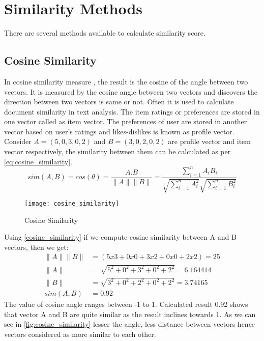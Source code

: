 
\section{Similarity Methods}
\label{similarity_methods}
There are several methods available to calculate similarity score.
\\

\subsection{Cosine Similarity}
\label{cosine_similarity}
In cosine similarity measure \cite{19}, the result is the cosine of the angle between two vectors. It is measured by the cosine angle between two vectors and discovers the direction between two vectors is same or not. Often it is used to calculate document similarity in text analysis. The item ratings or preferences are stored in one vector called as item vector. The preferences of user are stored in another vector based on user's ratings and likes-dislikes is known as profile vector. Consider $A = (5,0,3,0,2)$ and $B = (3,0,2,0,2)$ are profile vector and item vector respectively, the similarity between them can be calculated as per \autoref{eq:cosine_similarity}.
\\

\begin{equation}
sim(A,B) = cos(\theta) = \frac {A.B}{\parallel A \parallel \parallel B \parallel} = \frac{\sum_{i=1}^{n} {A_{i} B_{i}}}{\sqrt{\sum_{i=1}^{n} {A_{i}^2}} \sqrt{\sum_{i=1}^{n} {B_{i}^2}}}
\label{eq:cosine_similarity}
\end{equation}

\begin{figure}[H]
	\centering
	\texttt{[image: cosine\_similarity]}
	\caption{Cosine Similarity}
	\label{fig:cosine_similarity}
\end{figure}

\noindent
Using \autoref{cosine_similarity} if we compute cosine similarity between A and B vectors, then we get:
\begin{align*}
\parallel A \parallel \parallel B \parallel &=(5 x 3 + 0 x 0 + 3 x 2 + 0 x 0 + 2 x 2  ) = 25 \\
\parallel A \parallel  &= \sqrt{5^2 + 0^2 + 3^2 + 0^2 + 2^2}  = 6.164414 \\	     
\parallel B \parallel  &= \sqrt{3^2 + 0^2 + 2^2 + 0^2 + 2^2}  = 3.74165\\	     
sim(A,B)  &=  0.92 
\end{align*}
\noindent The value of cosine angle ranges between -1 to 1. Calculated result 0.92 shows that vector A and B are quite similar as the result inclines towards 1. As we can see in \autoref{fig:cosine_similarity} lesser the angle, less distance between vectors hence vectors considered as more similar to each other.
\\
